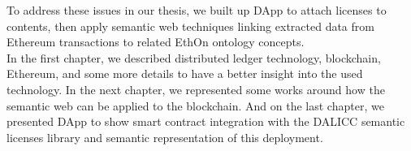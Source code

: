 To address these issues in our thesis, we built up DApp to attach licenses to contents, then apply semantic web techniques linking extracted data from Ethereum transactions to related EthOn ontology concepts. \\
In the first chapter, we described distributed ledger technology, blockchain, Ethereum, and some more details to have a better insight into the used technology. In the next chapter, we represented some works around how the semantic web can be applied to the blockchain. And on the last chapter, we presented DApp to show smart contract integration with the DALICC semantic licenses library and semantic representation of this deployment.